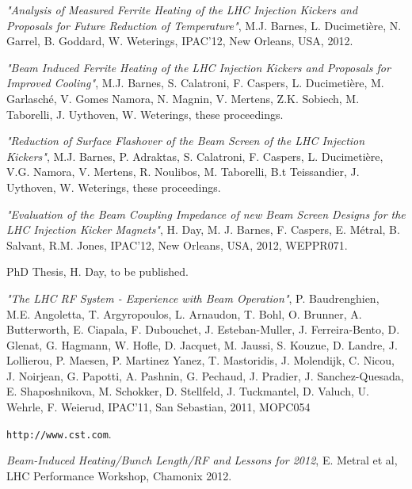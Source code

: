 \documentclass{JAC2003}
\begin{document}
\begin{thebibliography}{9}

\emph{"Analysis of Measured Ferrite Heating of the LHC Injection Kickers and Proposals for Future Reduction of Temperature"}, M.J. Barnes, L. Ducimetière, N. Garrel, B. Goddard, W. Weterings, IPAC'12, New Orleans, USA, 2012.

\emph{"Beam Induced Ferrite Heating of the LHC Injection Kickers and Proposals for Improved Cooling"}, M.J. Barnes, S. Calatroni, F. Caspers, L. Ducimetière, M. Garlasché, V. Gomes Namora, N. Magnin, V. Mertens, Z.K. Sobiech, M. Taborelli, J. Uythoven, W. Weterings, these proceedings.

\emph{"Reduction of Surface Flashover of the Beam Screen of the LHC Injection Kickers"}, M.J. Barnes, P. Adraktas, S. Calatroni, F. Caspers, L. Ducimetière, V.G. Namora, V. Mertens, R. Noulibos, M. Taborelli, B.t Teissandier, J. Uythoven, W. Weterings, these proceedings.

\emph{"Evaluation of the Beam Coupling Impedance of new Beam Screen Designs for the LHC Injection Kicker Magnets"}, H. Day, M. J. Barnes, F. Caspers, E. Métral, B. Salvant, R.M. Jones, IPAC'12, New Orleans, USA, 2012, WEPPR071.

PhD Thesis, H. Day, to be published.

\emph{"The LHC RF System - Experience with Beam Operation"}, P. Baudrenghien, M.E. Angoletta, T. Argyropoulos, L. Arnaudon, T. Bohl, O. Brunner, A. Butterworth, E. Ciapala, F. Dubouchet, J. Esteban-Muller, J. Ferreira-Bento, D. Glenat, G. Hagmann, W. Hofle, D. Jacquet, M. Jaussi, S. Kouzue, D. Landre, J. Lollierou, P. Maesen, P. Martinez Yanez, T. Mastoridis, J. Molendijk, C. Nicou, J. Noirjean, G. Papotti, A. Pashnin, G. Pechaud, J. Pradier, J. Sanchez-Quesada, E. Shaposhnikova, M. Schokker, D. Stellfeld, J. Tuckmantel, D. Valuch, U. Wehrle, F. Weierud, IPAC'11, San Sebastian, 2011, MOPC054

\texttt{http://www.cst.com}.

\emph{Beam-Induced Heating/Bunch Length/RF and Lessons for 2012}, E. Metral et al, LHC Performance Workshop, Chamonix 2012. 


\end{thebibliography}
\end{document}
